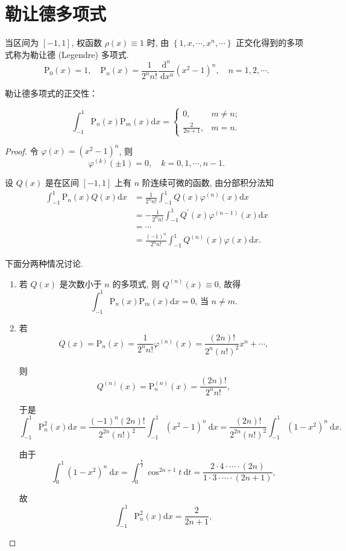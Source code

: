 \documentclass[12pt,a4paper]{article}
\begin{document}
	
	\noindent

	\section{勒让德多项式}
	
当区间为 $[-1,1]$, 权函数 $\rho(x) \equiv 1$ 时, 由 $\left\{1, x, \cdots, x^n, \cdots\right\}$ 正交化得到的多项式称为勒让德 (Legendre) 多项式.
$$
\mathrm{P}_0(x)=1, \quad \mathrm{P}_n(x)=\frac{1}{2^n n !} \frac{\mathrm{d}^n}{\mathrm{~d} x^n}\left(x^2-1\right)^n, \quad n=1,2, \cdots .
$$

勒让德多项式的正交性：

$$
\int_{-1}^1 \mathrm{P}_n(x) \mathrm{P}_m(x) \mathrm{d} x= \begin{cases}0, & m \neq n ; \\ \frac{2}{2 n+1}, & m=n .\end{cases}
$$

\begin{proof}
	令 $\varphi(x)=\left(x^2-1\right)^n$, 则
	$$
	\varphi^{(k)}( \pm 1)=0, \quad k=0,1, \cdots, n-1 .
	$$
	
	设 $Q(x)$ 是在区间 $[-1,1]$ 上有 $n$ 阶连续可微的函数, 由分部积分法知
	$$
	\begin{aligned}
		\int_{-1}^1 \mathrm{P}_n(x) Q(x) \mathrm{d} x & =\frac{1}{2^n n !} \int_{-1}^1 Q(x) \varphi^{(n)}(x) \mathrm{d} x \\
		& =-\frac{1}{2^n n !} \int_{-1}^1 Q^{\prime}(x) \varphi^{(n-1)}(x) \mathrm{d} x \\
		& =\cdots \\
		& =\frac{(-1)^n}{2^n n !} \int_{-1}^1 Q^{(n)}(x) \varphi(x) \mathrm{d} x .
	\end{aligned}
	$$
	
	下面分两种情况讨论.
	\begin{enumerate}
		\item 若 $Q(x)$ 是次数小于 $n$ 的多项式, 则 $Q^{(n)}(x) \equiv 0$, 故得
		$$
		\int_{-1}^1 \mathrm{P}_n(x) \mathrm{P}_m(x) \mathrm{d} x=0 \text {, 当 } n \neq m .
		$$
		\item 若
		$$
		Q(x)=\mathrm{P}_n(x)=\frac{1}{2^n n !} \varphi^{(n)}(x)=\frac{(2 n) !}{2^n(n !)^2} x^n+\cdots,
		$$
		
		则
		$$
		Q^{(n)}(x)=\mathrm{P}_n^{(n)}(x)=\frac{(2 n) !}{2^n n !},
		$$
		
		于是
		$$
		\int_{-1}^1 \mathrm{P}_n^2(x) \mathrm{d} x=\frac{(-1)^n(2 n) !}{2^{2 n}(n !)^2} \int_{-1}^1\left(x^2-1\right)^n \mathrm{~d} x=\frac{(2 n) !}{2^{2 n}(n !)^2} \int_{-1}^1\left(1-x^2\right)^n \mathrm{~d} x .
		$$
		
		由于
		$$
		\int_0^1\left(1-x^2\right)^n \mathrm{~d} x=\int_0^{\frac{\pi}{2}} \cos ^{2 n+1} t \mathrm{~d} t=\frac{2 \cdot 4 \cdot \cdots \cdot(2 n)}{1 \cdot 3 \cdot \cdots \cdot(2 n+1)},
		$$
		
		故
		$$
		\int_{-1}^1 \mathrm{P}_n^2(x) \mathrm{d} x=\frac{2}{2 n+1},
		$$
	\end{enumerate}
	
\end{proof}
\end{document}
